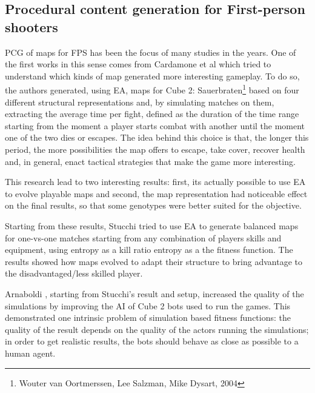 \subsection{Procedural content generation for First-person shooters}
PCG of maps for FPS has been the focus of many studies in the years. One of the first works in this sense comes from Cardamone et al \cite{cardamone_evolving_maps} which tried to understand which kinds of map generated more interesting gameplay. To do so, the authors generated, using EA, maps for Cube 2: Sauerbraten\footnote{Wouter van Oortmerssen, Lee Salzman, Mike Dysart, 2004} based on four different structural representations and, by simulating matches on them, extracting the average time per fight, defined as the duration of the time range starting from the moment a player starts combat with another until the moment one of the two dies or escapes. The idea behind this choice is that, the longer this period, the more possibilities the map offers to escape, take cover, recover health and, in general, enact tactical strategies that make the game more interesting.

This research lead to two interesting results: first, its actually possible to use EA to evolve playable maps and second, the map representation had noticeable effect on the final results, so that some genotypes were better suited for the objective.

Starting from these results, Stucchi \cite{stucchi_evoluzione} tried to use EA to generate balanced maps for one-vs-one matches starting from any combination of players skills and equipment, using entropy as a kill ratio entropy as a the fitness function. The results showed how maps evolved to adapt their structure to bring advantage to the disadvantaged/less skilled player.

Arnaboldi \cite{arnaboldi_framework}, starting from Stucchi's result and setup, increased the quality of the simulations by improving the AI of Cube 2 bots used to run the games. This demonstrated one intrinsic problem of simulation based fitness functions: the quality of the result depends on the quality of the actors running the simulations; in order to get realistic results, the bots should behave as close as possible to a human agent.

